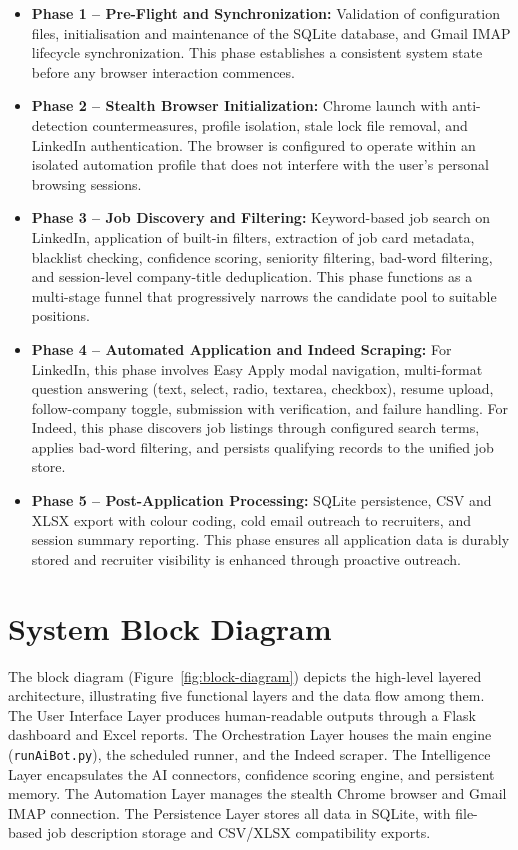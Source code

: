 \documentclass[12pt, a4paper, oneside]{report}
\begin{document}
\begin{itemize}
    \item \textbf{Phase 1 -- Pre-Flight and Synchronization:} Validation of configuration files, initialisation and maintenance of the SQLite database, and Gmail IMAP lifecycle synchronization. This phase establishes a consistent system state before any browser interaction commences.
    \item \textbf{Phase 2 -- Stealth Browser Initialization:} Chrome launch with anti-detection countermeasures, profile isolation, stale lock file removal, and LinkedIn authentication. The browser is configured to operate within an isolated automation profile that does not interfere with the user's personal browsing sessions.
    \item \textbf{Phase 3 -- Job Discovery and Filtering:} Keyword-based job search on LinkedIn, application of built-in filters, extraction of job card metadata, blacklist checking, confidence scoring, seniority filtering, bad-word filtering, and session-level company-title deduplication. This phase functions as a multi-stage funnel that progressively narrows the candidate pool to suitable positions.
    \item \textbf{Phase 4 -- Automated Application and Indeed Scraping:} For LinkedIn, this phase involves Easy Apply modal navigation, multi-format question answering (text, select, radio, textarea, checkbox), resume upload, follow-company toggle, submission with verification, and failure handling. For Indeed, this phase discovers job listings through configured search terms, applies bad-word filtering, and persists qualifying records to the unified job store.
    \item \textbf{Phase 5 -- Post-Application Processing:} SQLite persistence, CSV and XLSX export with colour coding, cold email outreach to recruiters, and session summary reporting. This phase ensures all application data is durably stored and recruiter visibility is enhanced through proactive outreach.
\end{itemize}

\section{System Block Diagram}
\label{sec:block-diagram}

The block diagram (Figure~\ref{fig:block-diagram}) depicts the high-level layered architecture, illustrating five functional layers and the data flow among them. The User Interface Layer produces human-readable outputs through a Flask dashboard and Excel reports. The Orchestration Layer houses the main engine (\texttt{runAiBot.py}), the scheduled runner, and the Indeed scraper. The Intelligence Layer encapsulates the AI connectors, confidence scoring engine, and persistent memory. The Automation Layer manages the stealth Chrome browser and Gmail IMAP connection. The Persistence Layer stores all data in SQLite, with file-based job description storage and CSV/XLSX compatibility exports.
\end{document}
